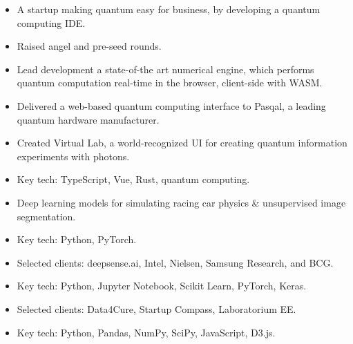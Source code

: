 \documentclass[10pt,a4paper,ragged2e,withhyper]{altacv}
\begin{document}
\begin{paracol}{2}


\begin{itemize}
\item A startup making quantum easy for business, by developing a quantum computing IDE.
\item Raised angel and pre-seed rounds.
\item Lead development a state-of-the art numerical engine, which performs quantum computation real-time in the browser, client-side with WASM.
\item Delivered a web-based quantum computing interface to Pasqal, a leading quantum hardware manufacturer.
\item Created Virtual Lab, a world-recognized UI for creating quantum information experiments with photons. 
\item Key tech: TypeScript, Vue, Rust, quantum computing.
\end{itemize}

\divider

\begin{itemize}
\item Deep learning models for simulating racing car physics \& unsupervised image segmentation.
\item Key tech: Python, PyTorch.
\end{itemize}

\divider

\begin{itemize}
\item Selected clients: deepsense.ai, Intel, Nielsen, Samsung Research, and BCG.
\item Key tech: Python, Jupyter Notebook, Scikit Learn, PyTorch, Keras.
\end{itemize}

\divider

\begin{itemize}
\item Selected clients: Data4Cure, Startup Compass, Laboratorium EE.
\item Key tech: Python, Pandas, NumPy, SciPy, JavaScript, D3.js.
\end{itemize}


\end{paracol}
\end{document}
